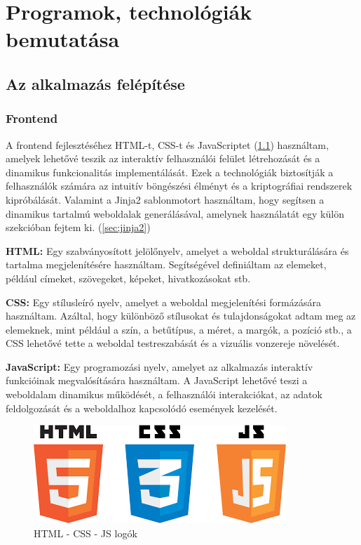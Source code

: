 \chapter{Programok, technológiák bemutatása} \label{fejezet2}

\section {Az alkalmazás felépítése}

\subsection{Frontend}

A frontend fejlesztéséhez HTML-t, CSS-t és JavaScriptet  (\ref{fig:logosFront}) használtam, amelyek lehetővé teszik az interaktív felhasználói felület létrehozását és a dinamikus funkcionalitás implementálását. Ezek a technológiák biztosítják a felhasználók számára az intuitív böngészési élményt és a kriptográfiai rendszerek kipróbálását.
Valamint a Jinja2 sablonmotort használtam, hogy segítsen a dinamikus tartalmú weboldalak generálásával, amelynek használatát egy külön szekcióban fejtem ki. (\ref{sec:jinja2})

\textbf{HTML:}
Egy szabványosított jelölőnyelv, amelyet a weboldal strukturálására és tartalma megjelenítésére használtam. Segítségével definiáltam az elemeket, például címeket, szövegeket, képeket, hivatkozásokat stb.

\textbf{CSS:}
Egy stílusleíró nyelv, amelyet a weboldal megjelenítési formázására használtam. Azáltal, hogy különböző stílusokat és tulajdonságokat adtam meg az elemeknek, mint például a szín, a betűtípus, a méret, a margók, a pozíció stb., a CSS lehetővé tette a weboldal testreszabását és a vizuális vonzereje növelését.

\textbf{JavaScript:}
Egy programozási nyelv, amelyet az alkalmazás interaktív funkcióinak megvalósítására használtam. A JavaScript lehetővé teszi a weboldalam dinamikus működését, a felhasználói interakciókat, az adatok feldolgozását és a weboldalhoz kapcsolódó események kezelését.

\begin{figure}[!h]
	\centering
	\includegraphics[scale=0.3]{images/logoHtmlCssJs}
	\caption{HTML - CSS - JS logók}
	\label{fig:logosFront}
\end{figure}


